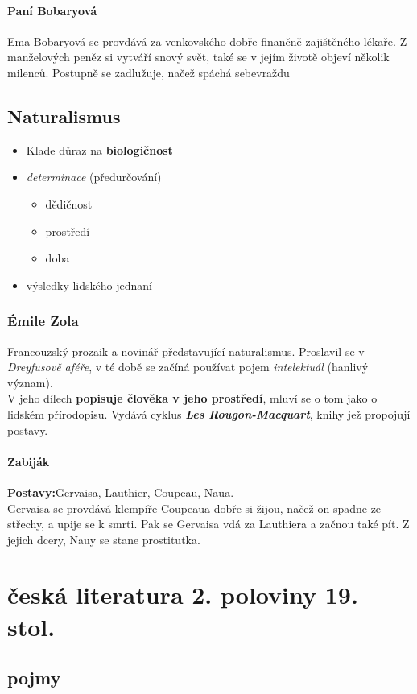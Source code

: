 \documentclass[10pt,a4page,headings,openany,%
oneside
,twocolumn
]{report}
\begin{document}
\subsubsection{Paní Bobaryová}
Ema Bobaryová se provdává za venkovského dobře finančně zajištěného lékaře. Z manželových peněz si vytváří snový svět, také se v jejím životě objeví několik milenců. Postupně se zadlužuje, načež spáchá sebevraždu
\section{Naturalismus}
\begin{itemize}
\item Klade důraz na \textbf{biologičnost}
\item \emph{determinace} (předurčování)
\begin{itemize}
\item dědičnost \item prostředí \item doba
\end{itemize}
\item výsledky lidského jednaní 
\end{itemize}
\subsection{Émile Zola}
Francouzský prozaik a novinář představující naturalismus. Proslavil se v \emph{Dreyfusově aféře}, v té době se začíná používat pojem \textit{intelektuál} (hanlivý význam).\\
V jeho dílech \textbf{popisuje člověka v jeho prostředí}, mluví se o tom jako o lidském přírodopisu. Vydává cyklus \emph{\textbf{Les Rougon-Macquart}}, knihy jež propojují postavy.
\subsubsection{Zabiják}
\textbf{Postavy:}Gervaisa, Lauthier, Coupeau, Naua.\\
Gervaisa se provdává klempíře Coupeaua dobře si žijou, načež on spadne ze střechy, a upije se k smrti. Pak se Gervaisa vdá za Lauthiera a začnou také pít. Z jejich dcery, Nauy se stane prostitutka.
\chapter{česká literatura 2. poloviny 19. stol.}
\section{pojmy}
\end{document}
